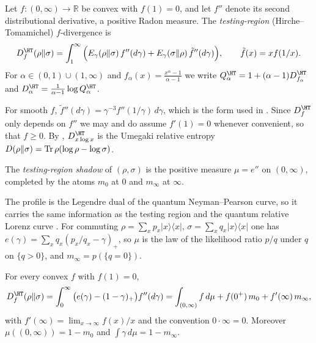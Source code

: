 \begin{definition}\label{shA:def:HT}
Let $f:(0,\infty)\to\mathbb R$ be convex with $f(1)=0$, and let $f''$ denote its second distributional derivative, a positive Radon measure. The \emph{testing-region} (Hirche--Tomamichel) $f$-divergence is
\[
D^\HT_f(\rho\|\sigma)=\int_1^\infty\Big(E_\gamma(\rho\|\sigma)\,f''(d\gamma)+E_\gamma(\sigma\|\rho)\,\tilde f''(d\gamma)\Big),\qquad \tilde f(x)=xf(1/x).
\]
For $\alpha\in(0,1)\cup(1,\infty)$ and $f_\alpha(x)=\frac{x^\alpha-1}{\alpha-1}$ we write $Q^\HT_\alpha=1+(\alpha-1)D^\HT_{f_\alpha}$ and $D^\HT_\alpha=\frac{1}{\alpha-1}\log Q^\HT_\alpha$.
\end{definition}

For smooth $f$, $\tilde f''(d\gamma)=\gamma^{-3}f''(1/\gamma)\,d\gamma$, which is the form used in \cite{HircheTomamichel2024}. Since $D^\HT_f$ only depends on $f''$ we may and do assume $f'(1)=0$ whenever convenient, so that $f\ge0$. By \cite{Frenkel2023}, $D^\HT_{x\log x}$ is the Umegaki relative entropy $D(\rho\|\sigma)=\operatorname{Tr}\rho(\log\rho-\log\sigma)$.

\begin{definition}\label{shA:def:shadow}
The \emph{testing-region shadow} of $(\rho,\sigma)$ is the positive measure $\mu=e''$ on $(0,\infty)$, completed by the atoms $m_0$ at $0$ and $m_\infty$ at $\infty$.
\end{definition}

The profile is the Legendre dual of the quantum Neyman--Pearson curve, so it carries the same information as the testing region and the quantum relative Lorenz curve \cite{Renes2016,BuscemiGour2017}. For commuting $\rho=\sum_xp_x|x\rangle\langle x|$, $\sigma=\sum_xq_x|x\rangle\langle x|$ one has $e(\gamma)=\sum_xq_x(p_x/q_x-\gamma)_+$, so $\mu$ is the law of the likelihood ratio $p/q$ under $q$ on $\{q>0\}$, and $m_\infty=p(\{q=0\})$.

\begin{proposition}[Representation]\label{shA:prop:rep}
For every convex $f$ with $f(1)=0$,
\[
D^\HT_f(\rho\|\sigma)=\int_0^\infty\big(e(\gamma)-(1-\gamma)_+\big)f''(d\gamma)=\int_{(0,\infty)}f\,d\mu+f(0^+)\,m_0+f'(\infty)\,m_\infty,
\]
with $f'(\infty)=\lim_{x\to\infty}f(x)/x$ and the convention $0\cdot\infty=0$. Moreover $\mu((0,\infty))=1-m_0$ and $\int\gamma\,d\mu=1-m_\infty$.
\end{proposition}

